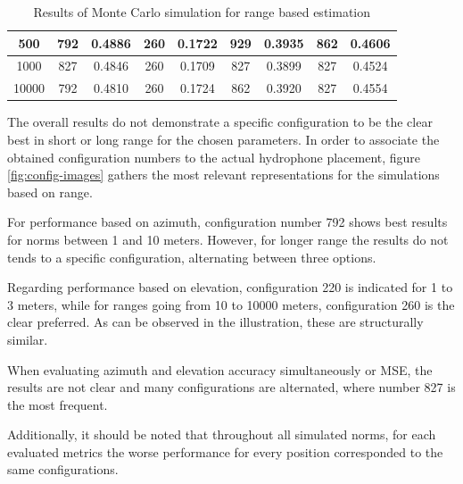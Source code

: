 \begin{table}[!htbp]
\begin{center}
{\begin{tabular}{ c | c c | c c | c c | c c}
				\midrule
				\multirow{1}{*}{500} & 792 & 0.4886 & 260 & 0.1722 & 929 & 0.3935 & 862 & 0.4606\\
				\midrule
				\multirow{1}{*}{1000} & 827 & 0.4846 & 260 & 0.1709 & 827 & 0.3899  & 827 & 0.4524\\
				\midrule
				\multirow{1}{*}{10000} & 792 & 0.4810 & 260 & 0.1724 & 862 & 0.3920  & 827 & 0.4554\\
				\bottomrule 
		\end{tabular}}
		\caption{Results of Monte Carlo simulation for range based estimation}
		\label{tab:montecarlo-best-all}
	\end{center}
\end{table}

The overall results do not demonstrate a specific configuration to be the clear best in short or long range for the chosen parameters. In order to associate the obtained configuration numbers to the actual hydrophone placement, figure \ref{fig:config-images} gathers the most relevant representations for the simulations based on range. 

For performance based on azimuth, configuration number 792 shows best results for norms between 1 and 10 meters. However, for longer range the results do not tends to a specific configuration, alternating between three options. 

Regarding performance based on elevation, configuration 220 is indicated for 1 to 3 meters, while for ranges going from 10 to 10000 meters, configuration 260 is the clear preferred. As can be observed in the illustration, these are structurally similar.

When evaluating azimuth and elevation accuracy simultaneously or MSE, the results are not clear and many configurations are alternated, where number 827 is the most frequent.

Additionally, it should be noted that throughout all simulated norms, for each evaluated metrics the worse performance for every position corresponded to the same configurations.


